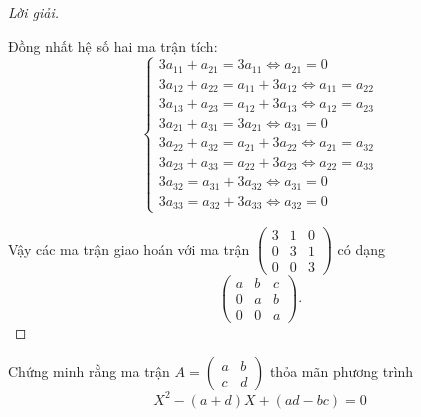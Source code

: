 \begin{proof}[Lời giải]
\[    \]
    \par Đồng nhất hệ số hai ma trận tích:
    \[
        \begin{cases}
            3a_{11} + a_{21} = 3a_{11} \Leftrightarrow a_{21} = 0               \\
            3a_{12} + a_{22} = a_{11} + 3a_{12} \Leftrightarrow a_{11} = a_{22} \\
            3a_{13} + a_{23} = a_{12} + 3a_{13} \Leftrightarrow a_{12} = a_{23} \\
            3a_{21} + a_{31} = 3a_{21} \Leftrightarrow a_{31} = 0               \\
            3a_{22} + a_{32} = a_{21} + 3a_{22} \Leftrightarrow a_{21} = a_{32} \\
            3a_{23} + a_{33} = a_{22} + 3a_{23} \Leftrightarrow a_{22} = a_{33} \\
            3a_{32} = a_{31} + 3a_{32} \Leftrightarrow a_{31} = 0               \\
            3a_{33} = a_{32} + 3a_{33} \Leftrightarrow a_{32} = 0
        \end{cases}
    \]
    
    Vậy các ma trận giao hoán với ma trận
    $\begin{pmatrix}
            3 & 1 & 0 \\
            0 & 3 & 1 \\
            0 & 0 & 3
        \end{pmatrix}$
    có dạng
    \[
        \begin{pmatrix}
            a & b & c \\
            0 & a & b \\
            0 & 0 & a
        \end{pmatrix}.
    \]
\end{proof}

\begin{exercise}\label{characteristic-poly}
    Chứng minh rằng ma trận
    $A = \begin{pmatrix}a & b \\ c & d\end{pmatrix}$ thỏa mãn phương trình
    \[
        X^{2} - (a+d)X + (ad-bc) = 0
    \]
\end{exercise}

